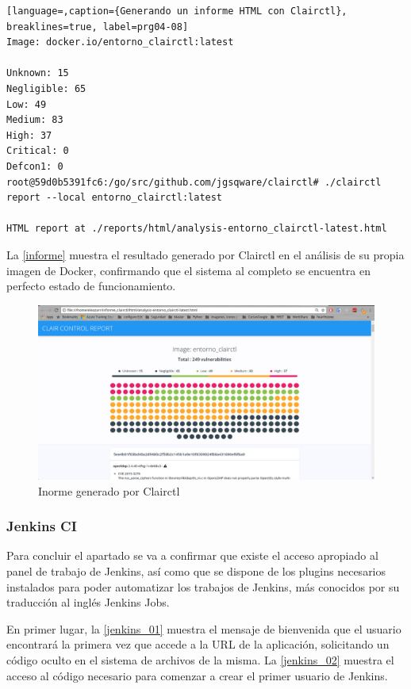 \begin{lstlisting}[language=,caption={Generando un informe HTML con Clairctl}, breaklines=true, label=prg04-08]
Image: docker.io/entorno_clairctl:latest

Unknown: 15
Negligible: 65
Low: 49
Medium: 83
High: 37
Critical: 0
Defcon1: 0
root@59d0b5391fc6:/go/src/github.com/jgsqware/clairctl# ./clairctl report --local entorno_clairctl:latest                  

HTML report at ./reports/html/analysis-entorno_clairctl-latest.html
\end{lstlisting}

La \autoref{informe} muestra el resultado generado por Clairctl en el análisis de su propia imagen de Docker, confirmando que el sistema al completo se encuentra en perfecto estado de funcionamiento.

\begin{figure}[htbp]
	\centering
	\includegraphics[width=1.0\linewidth]
	{desarrollo/figuras/informe_clairctl.png}
	\caption{Inorme generado por Clairctl}
	\label{informe}
\end{figure}

\subsubsection{Jenkins CI}

Para concluir el apartado se va a confirmar que existe el acceso apropiado al panel de trabajo de Jenkins, así como que se dispone de los plugins necesarios instalados para poder automatizar los trabajos de Jenkins, más conocidos por su traducción al inglés Jenkins Jobs.

En primer lugar, la \autoref{jenkins_01} muestra el mensaje de bienvenida que el usuario encontrará la primera vez que accede a la URL de la aplicación, solicitando un código oculto en el sistema de archivos de la misma. La \autoref{jenkins_02} muestra el acceso al código necesario para comenzar a crear el primer usuario de Jenkins.


